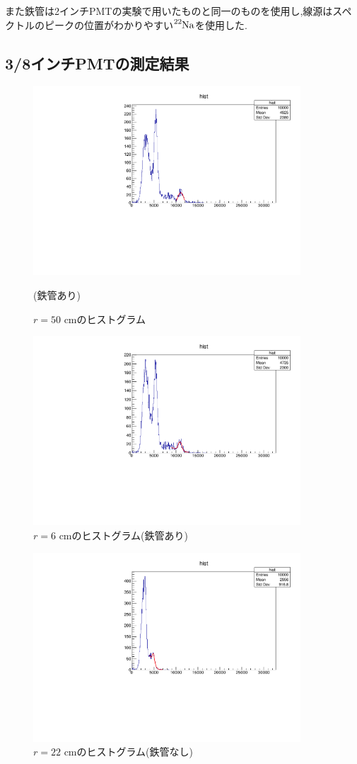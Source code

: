 また鉄管は2インチPMTの実験で用いたものと同一のものを使用し,線源はスペクトルのピークの位置がわかりやすい$\ce{^{22}Na}$を使用した.


\subsection{3/8インチPMTの測定結果}

\begin{figure}[h]
	\centering
		\includegraphics[angle=-90,width=10cm]{fig/iguchi/minicoin22.pdf}
	\caption{$r=50$ cmのヒストグラム}(鉄管あり)
	\label{histminicoin22}
\end{figure}

\begin{figure}[h]
	\centering
		\includegraphics[angle=-90,width=10cm]{fig/iguchi/minicoin21.pdf}
	\caption{$r=6$ cmのヒストグラム(鉄管あり)}
	\label{histminicoin21}
\end{figure}

\begin{figure}[h]
	\centering
		\includegraphics[angle=-90,width=10cm]{fig/iguchi/minicoout22.pdf}
	\caption{$r=22$ cmのヒストグラム(鉄管なし)}
	\label{histminicoout22}
\end{figure}


